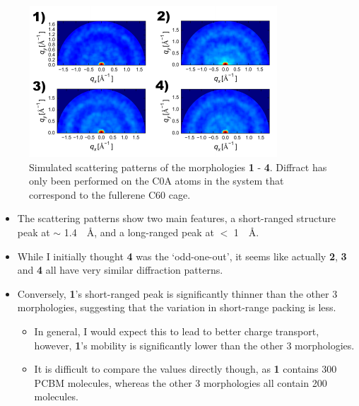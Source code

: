\documentclass[12pt]{article}
\begin{document}
\begin{figure}[h!]\centering
	\includegraphics[width=\textwidth]{Figures/Scattering.pdf}
    \caption{Simulated scattering patterns of the morphologies \textbf{1} - \textbf{4}.
    Diffract has only been performed on the C0A atoms in the system that correspond to the fullerene C60 cage.}
	\label{fig:scattering}
\end{figure}


\begin{itemize}
    \item{The scattering patterns show two main features, a short-ranged structure peak at $\sim$ \SI{1.4}{\per\angstrom}, and a long-ranged peak at $<$ \SI{1}{\per\angstrom}.}
    \item{While I initially thought \textbf{4} was the `odd-one-out', it seems like actually \textbf{2}, \textbf{3} and \textbf{4} all have very similar diffraction patterns.}
    \item{Conversely, \textbf{1}'s short-ranged peak is significantly thinner than the other 3 morphologies, suggesting that the variation in short-range packing is less.
        \begin{itemize}
        \item{In general, I would expect this to lead to better charge transport, however, \textbf{1}'s mobility is significantly lower than the other 3 morphologies.}
        \item{It is difficult to compare the values directly though, as \textbf{1} contains 300 PCBM molecules, whereas the other 3 morphologies all contain 200 molecules.}
        \end{itemize}}
\end{itemize}

\clearpage
\end{document}
